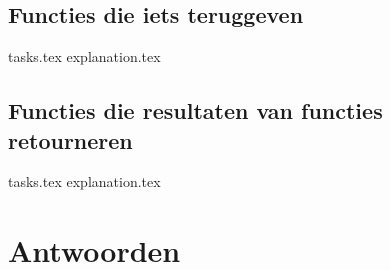 \documentclass[b5paper,openright,twoside]{report}
\begin{document}
    \section{Functies die iets teruggeven}
    {tasks.tex}             \newpage
    {explanation.tex}       \newpage

    \section{Functies die resultaten van functies retourneren}
    {tasks.tex}              \newpage
    {explanation.tex}        \newpage

    \chapter*{Antwoorden}
    \printsolutions[headings-template=collection]
\end{document}

